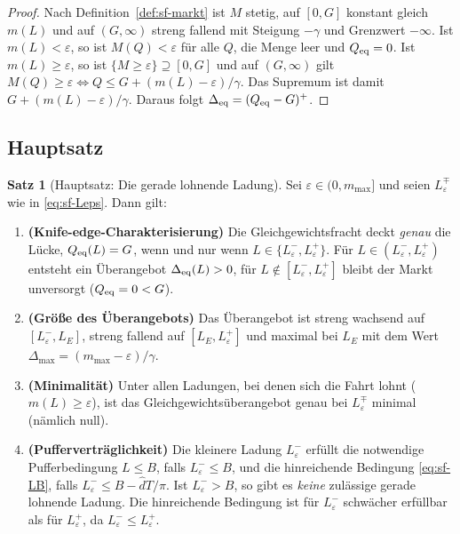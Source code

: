 \documentclass[a4paper, 12pt, twoside, openright]{report}
\providecommand{\dhat}{\hat d}      %
\theoremstyle{definition}
\theoremstyle{definition}
\newtheorem{satz}{Satz}[chapter]
\begin{document}
\begin{proof}
Nach Definition~\ref{def:sf-markt} ist $M$ stetig, auf $[0,G]$ konstant gleich $m(L)$
und auf $(G,\infty)$ streng fallend mit Steigung $-\gamma$ und Grenzwert $-\infty$.
Ist $m(L)<\varepsilon$, so ist $M(Q)<\varepsilon$ für alle $Q$, die Menge leer und
$Q_{\rm eq}=0$. Ist $m(L)\ge\varepsilon$, so ist $\{M\ge\varepsilon\}\supseteq[0,G]$ und
auf $(G,\infty)$ gilt $M(Q)\ge\varepsilon\iff Q\le G+(m(L)-\varepsilon)/\gamma$. Das
Supremum ist damit $G+(m(L)-\varepsilon)/\gamma$. Daraus folgt $\Delta_{\rm eq}=(Q_{\rm eq}-G)^+$.
\end{proof}

\subsection{Hauptsatz}

\begin{satz}[Hauptsatz: Die gerade lohnende Ladung]\label{satz:sf-haupt}
Sei $\varepsilon\in(0,m_{\max}]$ und seien $L_\varepsilon^\mp$ wie in
\eqref{eq:sf-Leps}. Dann gilt:
\begin{enumerate}
  \item \textbf{(Knife-edge-Charakterisierung)} Die Gleichgewichtsfracht deckt
    \emph{genau} die Lücke, $Q_{\rm eq}(L)=G$, wenn und nur wenn
    $L\in\{L_\varepsilon^-,L_\varepsilon^+\}$. Für $L\in(L_\varepsilon^-,L_\varepsilon^+)$
    entsteht ein Überangebot $\Delta_{\rm eq}(L)>0$, für
    $L\notin[L_\varepsilon^-,L_\varepsilon^+]$ bleibt der Markt unversorgt
    ($Q_{\rm eq}=0<G$).
  \item \textbf{(Größe des Überangebots)} Das Überangebot ist streng wachsend auf
    $[L_\varepsilon^-,L_E]$, streng fallend auf $[L_E,L_\varepsilon^+]$ und maximal bei
    $L_E$ mit dem Wert $\Delta_{\max}=(m_{\max}-\varepsilon)/\gamma$.
  \item \textbf{(Minimalität)} Unter allen Ladungen, bei denen sich die Fahrt
    lohnt ($m(L)\ge\varepsilon$), ist das Gleichgewichtsüberangebot genau bei
    $L_\varepsilon^\mp$ minimal (nämlich null).
  \item \textbf{(Pufferverträglichkeit)} Die kleinere Ladung $L_\varepsilon^-$ erfüllt
    die notwendige Pufferbedingung $L\le B$, falls $L_\varepsilon^-\le B$, und die
    hinreichende Bedingung \eqref{eq:sf-LB}, falls
    $L_\varepsilon^-\le B-\dhat T/\pi$. Ist $L_\varepsilon^->B$, so gibt es
    \emph{keine} zulässige gerade lohnende Ladung.
    Die hinreichende Bedingung ist für $L_\varepsilon^-$ schwächer erfüllbar als für
    $L_\varepsilon^+$, da $L_\varepsilon^-\le L_\varepsilon^+$.
\end{enumerate}
\end{satz}
\end{document}
